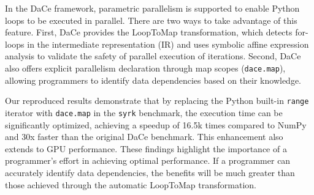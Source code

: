 In the DaCe framework, parametric parallelism is supported to enable Python loops to be executed in parallel. There are two ways to take advantage of this feature. First, DaCe provides the LoopToMap transformation, which detects for-loops in the intermediate representation (IR) and uses symbolic affine expression analysis to validate the safety of parallel execution of iterations. Second, DaCe also offers explicit parallelism declaration through map scopes (\texttt{dace.map}), allowing programmers to identify data dependencies based on their knowledge.

Our reproduced results demonstrate that by replacing the Python built-in \texttt{range} iterator with \texttt{dace.map} in the \texttt{syrk} benchmark, the execution time can be significantly optimized, achieving a speedup of 16.5k times compared to NumPy and 30x faster than the original DaCe benchmark. This enhancement also extends to GPU performance. These findings highlight the importance of a programmer's effort in achieving optimal performance. If a programmer can accurately identify data dependencies, the benefits will be much greater than those achieved through the automatic LoopToMap transformation.